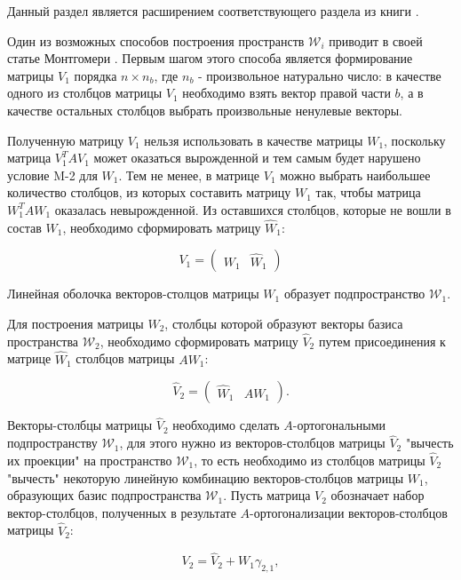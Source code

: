 Данный раздел является расширением соответствующего раздела из книги \cite[с.~44--50]{Zamarashkin}.

Один из возможных способов построения пространств $\mathcal W_i$ приводит в своей статье Монтгомери \cite{Montgomery}. Первым шагом
этого способа является формирование матрицы $V_1$ порядка $n \times n_b$, где $n_b$ - произвольное натурально число: в качестве одного
из столбцов матрицы $V_1$ необходимо взять вектор правой части $b$, а в качестве остальных столбцов выбрать произвольные ненулевые векторы.

Полученную матрицу $V_1$ нельзя использовать в качестве матрицы $W_1$, поскольку матрица $V_1^T A V_1$ может оказаться вырожденной и тем самым
будет нарушено условие M-2 для $W_1$. Тем не менее, в матрице $V_1$ можно выбрать наибольшее количество столбцов, из которых составить
матрицу $W_1$ так, чтобы матрица $W_1^T A W_1$ оказалась невырожденной. Из оставшихся столбцов, которые не вошли в состав $W_1$, необходимо
сформировать матрицу $\widehat{W}_1$:

$$
	V_1 =
		\begin{pmatrix}
			W_1 & \widehat{W}_1
		\end{pmatrix}
$$

Линейная оболочка векторов-столцов матрицы $W_1$ образует подпространство $\mathcal W_1$.

Для построения матрицы $W_2$, столбцы которой образуют векторы базиса пространства $\mathcal W_2$, необходимо сформировать матрицу
$\widehat{V}_2$ путем присоединения к матрице $\widehat{W}_1$ столбцов матрицы $A W_1$:

$$
	\widehat{V}_2 =
		\begin{pmatrix}
			\widehat{W}_1 & A W_1
		\end{pmatrix}
	.
$$

Векторы-столбцы матрицы $\widehat{V}_2$ необходимо сделать $A$-ортогональными подпространству $\mathcal W_1$, для этого нужно
из векторов-столбцов матрицы $\widehat{V}_2$ "вычесть их проекции"{} на пространство $\mathcal W_1$, то есть необходимо из столбцов матрицы
$\widehat{V}_2$ "вычесть"{} некоторую линейную комбинацию векторов-столбцов матрицы $W_1$, образующих базис подпространства
$\mathcal W_1$. Пусть матрица $V_2$ обозначает набор вектор-столбцов, полученных в результате $A$-ортогонализации векторов-столбцов
матрицы $\widehat{V}_2$:

\begin{equation} \label{equation:LM:FS:V_2_orthogonalization}
	V_2 = \widehat{V}_2 + W_1 \gamma_{2,1},
\end{equation}

